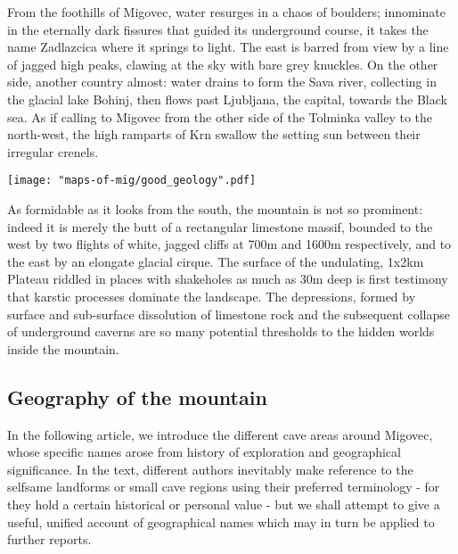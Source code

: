 From the foothills of Migovec, water resurges in a chaos of boulders; innominate in the eternally dark fissures that guided its underground course, it takes the name Zadlazcica where it springs to light.  The east is barred from view by a line of jagged high peaks, clawing at the sky with bare grey knuckles. On the other side, another country almost: water drains to form the Sava river, collecting in the glacial lake Bohinj, then flows past Ljubljana, the capital, towards the Black sea. As if calling to Migovec from the other side of the Tolminka valley to the north-west, the high ramparts of Krn swallow the setting sun between their irregular crenels.


 \begin{figure*}[b!]
 \checkoddpage \ifoddpage \forcerectofloat \else \forceversofloat \fi
\centering
  \texttt{[image: "maps-of-mig/good\_geology".pdf]}
  \label{map m}
 \end{figure*}


As formidable as it looks from the south, the mountain is not so prominent: indeed it is merely the butt of a rectangular limestone massif, bounded to the west by two flights of white, jagged cliffs at 700m and 1600m respectively, and to the east by an elongate glacial cirque. The surface of the undulating, 1x2km Plateau riddled in places with shakeholes as much as 30m deep is first testimony that karstic processes dominate the landscape. The depressions, formed by surface and sub-surface dissolution of limestone rock and the subsequent collapse of underground caverns are so many potential thresholds to the hidden worlds inside the mountain.

\subsection{Geography of the mountain}
In the following article, we introduce the different cave areas around Migovec, whose specific names arose from history of exploration and geographical significance. In the text, different authors inevitably make reference to the selfsame landforms or small cave regions using their preferred terminology - for they hold a certain historical or personal value - but we shall attempt to give a useful, unified account of geographical names which may in turn be applied to further reports. 



